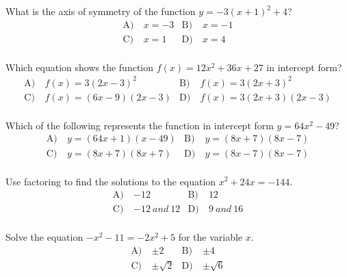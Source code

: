 \begin{problem}\label{Alg2-7}
What is the axis of symmetry of the function $y=-3(x+1)^2+4$?
\begin{align*}
\text{A)}\ & x=-3 &
\text{B)}\ & x=-1 \\
\text{C)}\ & x=1  &
\text{D)}\ & x=4\\
\end{align*}    
\end{problem}


\begin{problem}\label{Alg2-8}
Which equation shows the function $f(x)=12x^2+36x+27$ in intercept form?
\begin{align*}
\text{A)}\ & f(x)=3(2x-3)^2 &
\text{B)}\ & f(x)=3(2x+3)^2 \\
\text{C)}\ & f(x)=(6x-9)(2x-3)  &
\text{D)}\ & f(x)=3(2x+3)(2x-3)\\
\end{align*}    
\end{problem}


\begin{problem}\label{Alg2-9}
Which of the following represents the function in intercept form $y=64x^2-49$?
\begin{align*}
\text{A)}\ & y=(64x+1)(x-49) &
\text{B)}\ & y=(8x+7)(8x-7) \\
\text{C)}\ & y=(8x+7)(8x+7)  &
\text{D)}\ & y=(8x-7)(8x-7)\\
\end{align*}    
\end{problem}



\begin{problem}\label{Alg2-11}
Use factoring to find the solutions to the equation $x^2+24x=-144$.
\begin{align*}
\text{A)}\ & -12 &
\text{B)}\ & 12 \\
\text{C)}\ & -12 \ and \  12  &
\text{D)}\ & 9 \ and \ 16\\
\end{align*}    
\end{problem}


\begin{problem}\label{Alg2-12}
Solve the equation $-x^2-11=-2x^2+5$ for the variable $x$.
\begin{align*}
\text{A)}\ & \pm2 &
\text{B)}\ & \pm4 \\
\text{C)}\ & \pm\sqrt{2}  &
\text{D)}\ & \pm\sqrt{6}\\
\end{align*}    
\end{problem}


